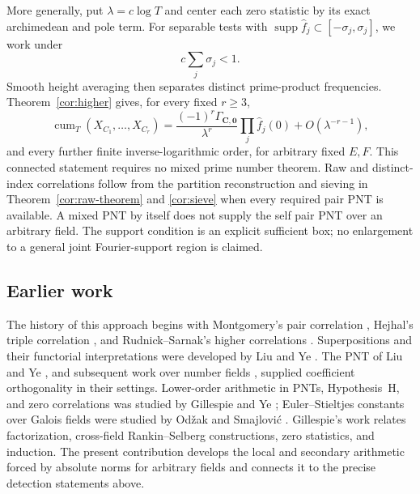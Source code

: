 \documentclass[11pt,reqno]{amsart}
\numberwithin{equation}{section}
\theoremstyle{definition}
\theoremstyle{remark}
\begin{document}
More generally, put $\lambda=c\log T$ and center each zero statistic by its exact archimedean and pole term. For separable tests with $\operatorname{supp}\widehat f_j\subset[-\sigma_j,\sigma_j]$, we work under
\begin{equation}c\sum_j\sigma_j<1.\label{in:support}\end{equation}
Smooth height averaging then separates distinct prime-product frequencies. Theorem~\ref{cor:higher} gives, for every fixed $r\ge3$,
\begin{equation}\operatorname{cum}_T(X_{C_1},\ldots,X_{C_r})=\frac{(-1)^r\Gamma_{\boldsymbol C,\boldsymbol0}}{\lambda^r}\prod_j\widehat f_j(0)+O(\lambda^{-r-1}),\label{in:cumulant}\end{equation}
and every further finite inverse-logarithmic order, for arbitrary fixed $E,F$. This connected statement requires no mixed prime number theorem. Raw and distinct-index correlations follow from the partition reconstruction and sieving in Theorem~\ref{cor:raw-theorem} and \eqref{cor:sieve} when every required pair PNT is available. A mixed PNT by itself does not supply the self pair PNT over an arbitrary field. The support condition is an explicit sufficient box; no enlargement to a general joint Fourier-support region is claimed.

\subsection{Earlier work}
The history of this approach begins with Montgomery's pair correlation \cite{Montgomery}, Hejhal's triple correlation \cite{Hejhal}, and Rudnick--Sarnak's higher correlations \cite{RS}. Superpositions and their functorial interpretations were developed by Liu and Ye \cite{LiuYe2002,LiuYe2008,LiuYe2009}. The PNT of Liu and Ye \cite{LiuYe2007}, and subsequent work over number fields \cite{GillespieJi}, supplied coefficient orthogonality in their settings. Lower-order arithmetic in PNTs, Hypothesis~H, and zero correlations was studied by Gillespie and Ye \cite{GY2014,GY2016}; Euler--Stieltjes constants over Galois fields were studied by Od\v{z}ak and Smajlovi\'c \cite{OS2016}. Gillespie's work \cite{Gillespie2013,Gillespie2014,Gillespie2017} relates factorization, cross-field Rankin--Selberg constructions, zero statistics, and induction. The present contribution develops the local and secondary arithmetic forced by absolute norms for arbitrary fields and connects it to the precise detection statements above.
\end{document}
